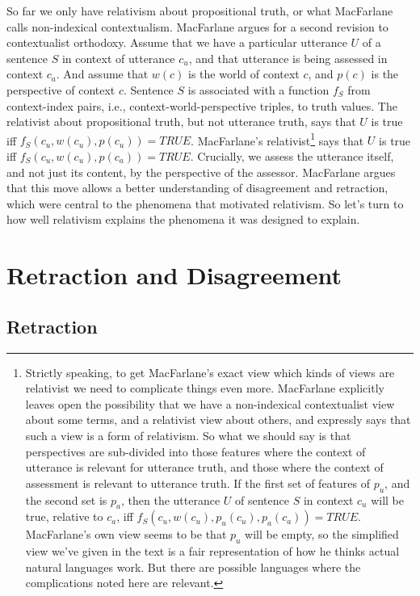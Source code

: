 So far we only have relativism about propositional truth, or what MacFarlane calls non-indexical contextualism. MacFarlane argues for a second revision to contextualist orthodoxy. Assume that we have a particular utterance $U$ of a sentence $S$ in context of utterance $c_u$, and that utterance is being assessed in context $c_a$. And assume that $w(c)$ is the world of context $c$, and $p(c)$ is the perspective of context $c$. Sentence $S$ is associated with a function $f_S$ from context-index pairs, i.e., context-world-perspective triples, to truth values. The relativist about propositional truth, but not utterance truth, says that $U$ is true iff $f_S(c_u, w(c_u), p(c_u)) = TRUE$. MacFarlane's relativist\footnote{Strictly speaking, to get MacFarlane's exact view which kinds of views are relativist we need to complicate things even more. MacFarlane explicitly leaves open the possibility that we have a non-indexical contextualist view about some terms, and a relativist view about others, and expressly says that such a view is a form of relativism. So what we should say is that perspectives are sub-divided into those features where the context of utterance is relevant for utterance truth, and those where the context of assessment is relevant to utterance truth. If the first set of features of $p_u$, and the second set is $p_a$, then the utterance $U$ of sentence $S$ in context $c_u$ will be true, relative to $c_a$, iff $f_S(c_u, w(c_u), p_u(c_u), p_a(c_a)) = TRUE$. MacFarlane's own view seems to be that $p_u$ will be empty, so the simplified view we've given in the text is a fair representation of how he thinks actual natural languages work. But there are possible languages where the complications noted here are relevant.} says that $U$ is true iff $f_S(c_u, w(c_u), p(c_a)) = TRUE$. Crucially, we assess the utterance itself, and not just its content, by the perspective of the assessor. MacFarlane argues that this move allows a better understanding of disagreement and retraction, which were central to the phenomena that motivated relativism. So let's turn to how well relativism explains the phenomena it was designed to explain.

\section{Retraction and Disagreement}
\label{retractionanddisagreement}

\subsection{Retraction}
\label{retraction}

